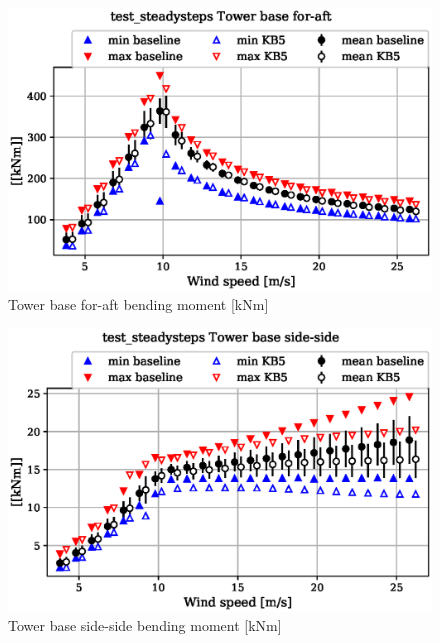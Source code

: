 \begin{figure}[!ht]
\begin{center}
	\includegraphics[width=.85\linewidth]{figures/baseline-vs-KB6/test_steadysteps/tower-tower-node-001-momentvec-x_AA0007_AA0003.eps}
\end{center}
\caption{Tower base for-aft bending moment [kNm]}
\label{fig:baseline-vs-KB6:test_steadysteps:tower-base-fa}
\end{figure}

\begin{figure}[!ht]
\begin{center}
	\includegraphics[width=.85\linewidth]{figures/baseline-vs-KB6/test_steadysteps/tower-tower-node-001-momentvec-y_AA0007_AA0003.eps}
\end{center}
\caption{Tower base side-side bending moment [kNm]}
\label{fig:baseline-vs-KB6:test_steadysteps:tower-base-ss}
\end{figure}


